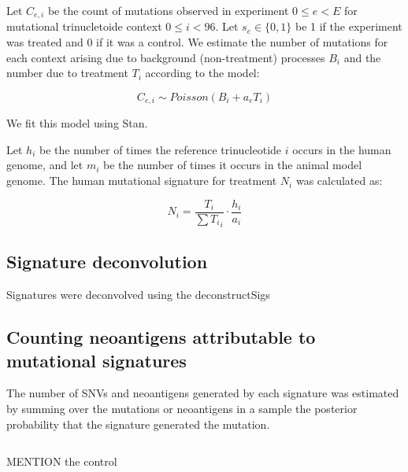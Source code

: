 Let $C_{e,i}$ be the count of mutations observed in experiment $0 \leq e \lt E$ for mutational trinucletoide context $0 \leq i \lt 96$. Let $s_e \in \{0,1\}$ be 1 if the experiment was treated and 0 if it was a control. We estimate the number of mutations for each context arising due to background (non-treatment) processes $B_i$ and the number due to treatment $T_i$ according to the model:

\[
C_{e,i} \sim \mathit{Poisson}(B_i + a_e T_i)
\]

We fit this model using Stan\cite{Gelman_2015}.

Let $h_i$ be the number of times the reference trinucleotide $i$ occurs in the human genome, and let $m_i$ be the number of times it occurs in the animal model genome. The human mutational signature for treatment $N_i$ was calculated as:

\[
N_i = \frac{T_i}{\sum{T_i}_i} \cdot \frac{h_i}{a_i}
\]


\subsection*{Signature deconvolution}
Signatures were deconvolved using the deconstructSigs\cite{Rosenthal_2016}

\subsection*{Counting neoantigens attributable to mutational signatures}
The number of SNVs and neoantigens generated by each signature was estimated by summing over the mutations or neoantigens in a sample the posterior probability that the signature generated the mutation.

\[



\]


MENTION the control



